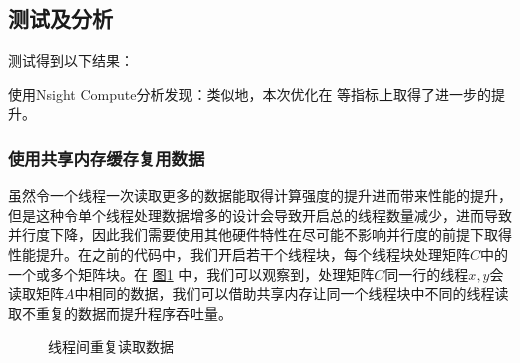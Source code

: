 \documentclass[letterpaper,10pt,english]{sphinxmanual}
\let\sphinxpxdimen\pdfpxdimen\else\newdimen\sphinxpxdimen
\begin{document}
\subsection{测试及分析}
\label{\detokenize{chapter_accelerator/accelerator_practise:id9}}
\sphinxAtStartPar
测试得到以下结果：

\begin{sphinxVerbatim}[commandchars=\\\{\}]
  
       
\end{sphinxVerbatim}

\sphinxAtStartPar
使用Nsight Compute分析发现：类似地，本次优化在
等指标上取得了进一步的提升。


\subsubsection{使用共享内存缓存复用数据}
\label{\detokenize{chapter_accelerator/accelerator_practise:sec-accelerator-use-smem}}\label{\detokenize{chapter_accelerator/accelerator_practise:id10}}
\sphinxAtStartPar
虽然令一个线程一次读取更多的数据能取得计算强度的提升进而带来性能的提升，但是这种令单个线程处理数据增多的设计会导致开启总的线程数量减少，进而导致并行度下降，因此我们需要使用其他硬件特性在尽可能不影响并行度的前提下取得性能提升。在之前的代码中，我们开启若干个线程块，每个线程块处理矩阵\(C\)中的一个或多个矩阵块。在
\hyperref[\detokenize{chapter_accelerator/accelerator_practise:duplicated-data}]{图\ref{\detokenize{chapter_accelerator/accelerator_practise:duplicated-data}}}
中，我们可以观察到，处理矩阵\(C\)同一行的线程\(x, y\)会读取矩阵\(A\)中相同的数据，我们可以借助共享内存让同一个线程块中不同的线程读取不重复的数据而提升程序吞吐量。

\begin{figure}[H]
\centering
\capstart

\noindent\sphinxincludegraphics[width=800\sphinxpxdimen]{{duplicated_data}.svg}
\caption{线程间重复读取数据}\label{\detokenize{chapter_accelerator/accelerator_practise:id27}}\label{\detokenize{chapter_accelerator/accelerator_practise:duplicated-data}}\end{figure}
\end{document}
